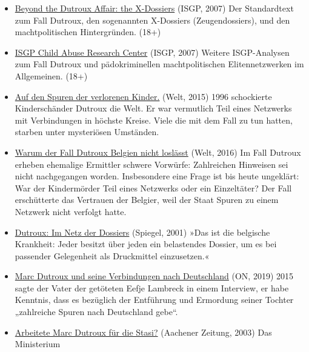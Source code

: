 \begin{itemize}
\tightlist
\item
  \href{https://isgp-studies.com/belgian-x-dossiers-of-the-dutroux-affair}{Beyond
  the Dutroux Affair: the X-Dossiers} (ISGP, 2007) Der Standardtext zum
  Fall Dutroux, den sogenannten X-Dossiers (Zeugendossiers), und den
  machtpolitischen Hintergründen. (18+)
\item
  \href{https://isgp-studies.com/scare}{ISGP Child Abuse Research
  Center} (ISGP, 2007) Weitere ISGP-Analysen zum Fall Dutroux und
  pädokriminellen machtpolitischen Elitennetzwerken im Allgemeinen.
  (18+)
\item
  \href{https://www.welt.de/vermischtes/article143879658/Auf-den-Spuren-der-verlorenen-Kinder.html}{Auf
  den Spuren der verlorenen Kinder.} (Welt, 2015) 1996 schockierte
  Kinderschänder Dutroux die Welt. Er war vermutlich Teil eines
  Netzwerks mit Verbindungen in höchste Kreise. Viele die mit dem Fall
  zu tun hatten, starben unter mysteriösen Umständen.
\item
  \href{https://www.welt.de/politik/deutschland/article157527536/Warum-der-Fall-Dutroux-Belgien-nicht-loslaesst.html}{Warum
  der Fall Dutroux Belgien nicht loslässt} (Welt, 2016) Im Fall Dutroux
  erheben ehemalige Ermittler schwere Vorwürfe: Zahlreichen Hinweisen
  sei nicht nachgegangen worden. Insbesondere eine Frage ist bis heute
  ungeklärt: War der Kindermörder Teil eines Netzwerks oder ein
  Einzeltäter? Der Fall erschütterte das Vertrauen der Belgier, weil der
  Staat Spuren zu einem Netzwerk nicht verfolgt hatte.
\item
  \href{http://www.spiegel.de/spiegel/print/d-20353850.html}{Dutroux: Im
  Netz der Dossiers} (Spiegel, 2001) »Das ist die belgische Krankheit:
  Jeder besitzt über jeden ein belastendes Dossier, um es bei passender
  Gelegenheit als Druckmittel einzusetzen.«
\item
  \href{https://olivernevermind.wordpress.com/2019/09/22/x-akten-vollstaendig-ausgewertet-marc-dutroux-und-seine-verbindungen-nach-deutschland/}{Marc
  Dutroux und seine Verbindungen nach Deutschland} (ON, 2019) 2015 sagte
  der Vater der getöteten Eefje Lambreck in einem Interview, er habe
  Kenntnis, dass es bezüglich der Entführung und Ermordung seiner
  Tochter „zahlreiche Spuren nach Deutschland gebe``. 
\item
  \href{https://www.aachener-zeitung.de/kultur/arbeitete-marc-dutroux-fuer-die-stasi_aid-28642109}{Arbeitete
  Marc Dutroux für die Stasi?} (Aachener Zeitung, 2003) Das Ministerium

\end{itemize}
